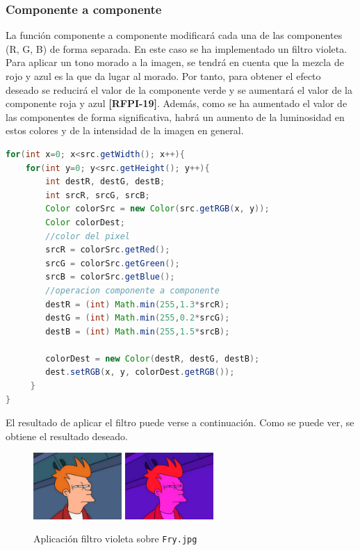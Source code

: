 \subsubsection{Componente a componente}
La función componente a componente modificará cada una de las componentes (R, G, B) de forma separada.\vskip0.3cm
En este caso se ha implementado un filtro violeta. Para aplicar un tono morado a la imagen, se tendrá en cuenta que la mezcla de rojo y azul es la que da lugar al morado. Por tanto, para obtener el efecto deseado se reducirá el valor de la componente verde y se aumentará el valor de la componente roja y azul \textbf{[RFPI-19]}.
\vskip0.3cm
Además, como se ha aumentado el valor de las componentes de forma significativa, habrá un aumento de la luminosidad en estos colores y de la intensidad de la imagen en general.
\vskip0.3cm
\begin{lstlisting}[language=Java, caption=Operación componente a componente, label=lst:graddesc]
for(int x=0; x<src.getWidth(); x++){
    for(int y=0; y<src.getHeight(); y++){
        int destR, destG, destB;
        int srcR, srcG, srcB;
        Color colorSrc = new Color(src.getRGB(x, y));
        Color colorDest;
        //color del pixel
        srcR = colorSrc.getRed();
        srcG = colorSrc.getGreen();
        srcB = colorSrc.getBlue();
        //operacion componente a componente
        destR = (int) Math.min(255,1.3*srcR);
        destG = (int) Math.min(255,0.2*srcG);
        destB = (int) Math.min(255,1.5*srcB);
                
        colorDest = new Color(destR, destG, destB);
        dest.setRGB(x, y, colorDest.getRGB());
     }
}
\end{lstlisting}
El resultado de aplicar el filtro puede verse a continuación. Como se puede ver, se obtiene el resultado deseado.
\vskip0.3cm
\begin{figure}[H]
 \centering
  \includegraphics[width=0.3\textwidth]{imagenes/Fry.jpg}
  \includegraphics[width=0.3\textwidth]{imagenes/fryVioleta.jpg}
 \caption{Aplicación filtro violeta sobre \texttt{Fry.jpg}}
 \label{diseño}
 \end{figure}

